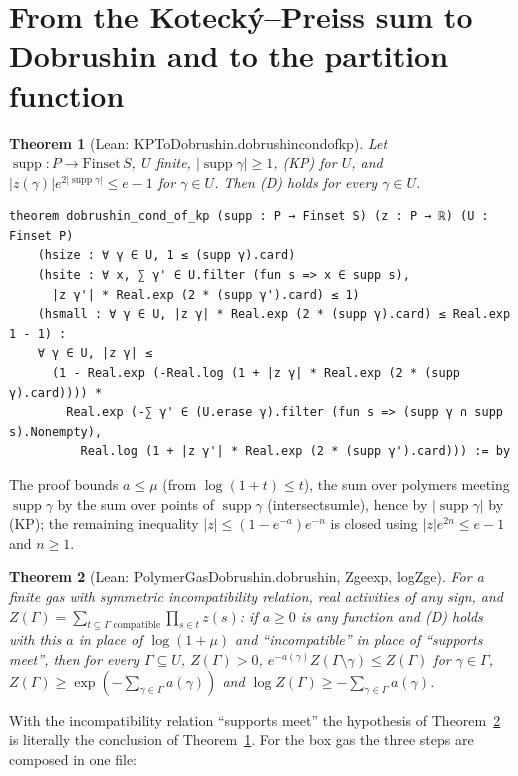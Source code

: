 \documentclass[11pt,a4paper]{article}
\newtheorem{theorem}{Theorem}[section]
\theoremstyle{definition}
\theoremstyle{remark}
\DeclareRobustCommand{\lean}[1]{{\ttfamily\renewcommand{\_}{\textunderscore\allowbreak}#1}}
\newenvironment{leanquote}{\par\smallskip\footnotesize}{\par\smallskip}
\newcommand{\supp}{\operatorname{supp}}
\begin{document}
\section{From the Kotecký--Preiss sum to Dobrushin and to the partition function}\label{sec:dobrushin}

\begin{theorem}[Lean: \lean{KPToDobrushin.dobrushin\_cond\_of\_kp}]\label{thm:kpd}
Let $\supp:P\to\mathrm{Finset}\,S$, $U$ finite, $|\supp\gamma|\ge1$, (KP) for $U$, and $|z(\gamma)|e^{2|\supp\gamma|}\le e-1$ for $\gamma\in U$. Then (D) holds for every $\gamma\in U$.
\end{theorem}
\begin{leanquote}
\begin{verbatim}
theorem dobrushin_cond_of_kp (supp : P → Finset S) (z : P → ℝ) (U : Finset P)
    (hsize : ∀ γ ∈ U, 1 ≤ (supp γ).card)
    (hsite : ∀ x, ∑ γ' ∈ U.filter (fun s => x ∈ supp s),
      |z γ'| * Real.exp (2 * (supp γ').card) ≤ 1)
    (hsmall : ∀ γ ∈ U, |z γ| * Real.exp (2 * (supp γ).card) ≤ Real.exp 1 - 1) :
    ∀ γ ∈ U, |z γ| ≤
      (1 - Real.exp (-Real.log (1 + |z γ| * Real.exp (2 * (supp γ).card)))) *
        Real.exp (-∑ γ' ∈ (U.erase γ).filter (fun s => (supp γ ∩ supp s).Nonempty),
          Real.log (1 + |z γ'| * Real.exp (2 * (supp γ').card))) := by
\end{verbatim}
\end{leanquote}
The proof bounds $a\le\mu$ (from $\log(1+t)\le t$), the sum over polymers meeting $\supp\gamma$ by the sum over points of $\supp\gamma$ (\lean{intersect\_sum\_le}), hence by $|\supp\gamma|$ by (KP); the remaining inequality $|z|\le(1-e^{-a})e^{-n}$ is closed using $|z|e^{2n}\le e-1$ and $n\ge1$.

\begin{theorem}[Lean: \lean{PolymerGasDobrushin.dobrushin}, \lean{Z\_ge\_exp}, \lean{log\_Z\_ge}]\label{thm:Z}
For a finite gas with symmetric incompatibility relation, real activities of any sign, and $Z(\Gamma)=\sum_{t\subseteq\Gamma\text{ compatible}}\prod_{s\in t}z(s)$: if $a\ge0$ is any function and (D) holds with this $a$ in place of $\log(1+\mu)$ and ``incompatible'' in place of ``supports meet'', then for every $\Gamma\subseteq U$, $Z(\Gamma)>0$, $e^{-a(\gamma)}Z(\Gamma\setminus\gamma)\le Z(\Gamma)$ for $\gamma\in\Gamma$, $Z(\Gamma)\ge\exp(-\sum_{\gamma\in\Gamma}a(\gamma))$ and $\log Z(\Gamma)\ge-\sum_{\gamma\in\Gamma}a(\gamma)$.
\end{theorem}
With the incompatibility relation ``supports meet'' the hypothesis of Theorem~\ref{thm:Z} is literally the conclusion of Theorem~\ref{thm:kpd}. For the box gas the three steps are composed in one file:
\end{document}
